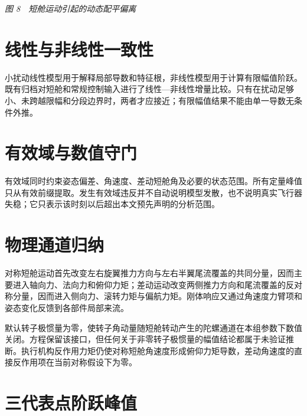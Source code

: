 \documentclass[UTF8,12pt,oneside,openany,fontset=windows]{ctexbook}
\begin{document}
\emph{图 8　短舱运动引起的动态配平偏离}
\section{线性与非线性一致性}

小扰动线性模型用于解释局部导数和特征根，非线性模型用于计算有限幅值阶跃。既有归档对短舱和常规控制输入进行了线性—非线性增量比较。只有在扰动足够小、未跨越限幅和分段边界时，两者才应接近；有限幅值结果不能由单一导数无条件外推。

\section{有效域与数值守门}

有效域同时约束姿态偏差、角速度、差动短舱角及必要的状态范围。所有定量峰值只从有效前缀提取。发生有效域违反并不自动说明模型发散，也不说明真实飞行器失稳；它只表示该时刻以后超出本文预先声明的分析范围。

\section{物理通道归纳}

对称短舱运动首先改变左右旋翼推力方向与左右半翼尾流覆盖的共同分量，因而主要进入轴向力、法向力和俯仰力矩；差动运动改变两侧推力方向和尾流覆盖的反对称分量，因而进入侧向力、滚转力矩与偏航力矩。刚体响应又通过角速度力臂项和姿态变化反馈到各部件局部来流。

默认转子极惯量为零，使转子角动量随短舱转动产生的陀螺通道在本组参数下数值关闭。方程保留该接口，但任何关于非零转子极惯量的幅值结论都属于未验证推断。执行机构反作用力矩仍使对称短舱角速度形成俯仰力矩导数，差动角速度的直接反作用项在当前对称假设下为零。

\section{三代表点阶跃峰值}
\end{document}
